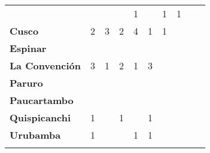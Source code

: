 \begin{tabular}{lccccccccc}
	&\cellcolor[HTML]{FCC46C}					
	&\cellcolor[HTML]{FCC46C}
	&\cellcolor[HTML]{FCC46C}					
	&1
	&\cellcolor[HTML]{FCC46C}
	&1
	&1\\
	\textbf{Cusco}      															
	&2		
	&3											
	&2
	&4											
	&1
	&1
	&\cellcolor[HTML]{FCC46C}
	&\cellcolor[HTML]{FCC46C}\\								
	\textbf{Espinar}       					             							
	&\cellcolor[HTML]{FCC46C}					
	&\cellcolor[HTML]{FCC46C}
	&\cellcolor[HTML]{FCC46C}					
	&\cellcolor[HTML]{FCC46C}
	&\cellcolor[HTML]{FCC46C}					
	&\cellcolor[HTML]{FCC46C}
	&\cellcolor[HTML]{FCC46C}
	&\cellcolor[HTML]{FCC46C}\\	
	\textbf{La Convención}       
	&3											
	&1											
	&2											
	&1											
	&3
	&\cellcolor[HTML]{FCC46C}
	&\cellcolor[HTML]{FCC46C}
	&\cellcolor[HTML]{FCC46C}\\	
	\textbf{Paruro}                            					
	&\cellcolor[HTML]{FCC46C}					
	&\cellcolor[HTML]{FCC46C}					
	&\cellcolor[HTML]{FCC46C}					
	&\cellcolor[HTML]{FCC46C}					
	&\cellcolor[HTML]{FCC46C}
	&\cellcolor[HTML]{FCC46C} 					
	&\cellcolor[HTML]{FCC46C}
	&\cellcolor[HTML]{FCC46C}\\
	\textbf{Paucartambo}               		                       					
	&\cellcolor[HTML]{FCC46C}					
	&\cellcolor[HTML]{FCC46C}
	&\cellcolor[HTML]{FCC46C}					
	&\cellcolor[HTML]{FCC46C}
	&\cellcolor[HTML]{FCC46C}					
	&\cellcolor[HTML]{FCC46C}
	&\cellcolor[HTML]{FCC46C}
	&\cellcolor[HTML]{FCC46C}\\
	\textbf{Quispicanchi}          	      				
	&1											
	&\cellcolor[HTML]{FCC46C}					
	&1											
	&\cellcolor[HTML]{FCC46C}					
	&1
	&\cellcolor[HTML]{FCC46C}
	&\cellcolor[HTML]{FCC46C}
	&\cellcolor[HTML]{FCC46C}\\
	\textbf{Urubamba}  					
	&1											
	&\cellcolor[HTML]{FCC46C}					
	&\cellcolor[HTML]{FCC46C}					
	&1											
	&1	
	&\cellcolor[HTML]{FCC46C}
	&\cellcolor[HTML]{FCC46C}
	&\cellcolor[HTML]{FCC46C}\\						
	&\multicolumn{1}{l}{}                       &\multicolumn{1}{l}{}            &\multicolumn{1}{l}{}                         
	&\multicolumn{1}{l}{}                       &\multicolumn{1}{l}{}            &\multicolumn{1}{l}{}                       &\multicolumn{1}{l}{}                       &\multicolumn{1}{l}{}            			    
\end{tabular}